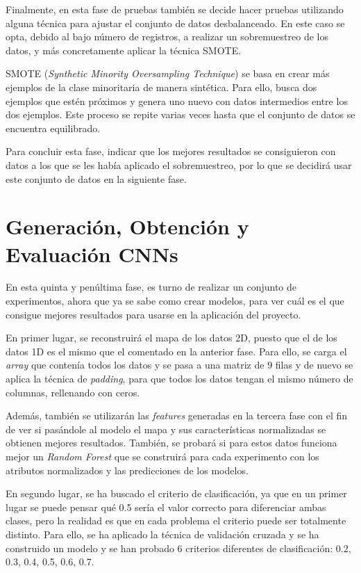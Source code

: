 Finalmente, en esta fase de pruebas también se decide hacer pruebas utilizando alguna técnica para ajustar el conjunto de datos desbalanceado. En este caso se opta, debido al bajo número de registros, a realizar un sobremuestreo de los datos, y más concretamente aplicar la técnica SMOTE.

SMOTE (\emph{Synthetic Minority Oversampling Technique}) se basa en crear más ejemplos de la clase minoritaria de manera sintética. Para ello, busca dos ejemplos que estén próximos y genera uno nuevo con datos intermedios entre los dos ejemplos. Este proceso se repite varias veces hasta que el conjunto de datos se encuentra equilibrado.

Para concluir esta fase, indicar que los mejores resultados se consiguieron con datos a los que se les había aplicado el sobremuestreo, por lo que se decidirá usar este conjunto de datos en la siguiente fase.

\section{Generación, Obtención y Evaluación CNNs}
En esta quinta y penúltima fase, es turno de realizar un conjunto de experimentos, ahora que ya se sabe como crear modelos, para ver cuál es el que consigue mejores resultados para usarse en la aplicación del proyecto.

En primer lugar, se reconstruirá el mapa de los datos 2D, puesto que el de los datos 1D es el mismo que el comentado en la anterior fase. Para ello, se carga el \emph{array} que contenía todos los datos y se pasa a una matriz de 9 filas y de nuevo se aplica la técnica de \emph{padding}, para que todos los datos tengan el mismo número de columnas, rellenando con ceros.

Además, también se utilizarán las \emph{features} generadas en la tercera fase con el fin de ver si pasándole al modelo el mapa y sus características normalizadas se obtienen mejores resultados. También, se probará si para estos datos funciona mejor un \emph{Random Forest} que se construirá para cada experimento con los atributos normalizados y las predicciones de los modelos.

En segundo lugar, se ha buscado el criterio de clasificación, ya que en un primer lugar se puede pensar qué 0.5 sería el valor correcto para diferenciar ambas clases, pero la realidad es que en cada problema el criterio puede ser totalmente distinto. Para ello, se ha aplicado la técnica de validación cruzada y se ha construido un modelo y se han probado 6 criterios diferentes de clasificación: 0.2, 0.3, 0.4, 0.5, 0.6, 0.7. 

